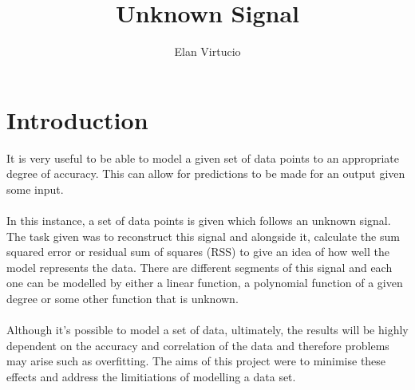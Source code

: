 \documentclass[a4paper,11pt]{article}
\begin{document}
\title{\Large{\textbf{Unknown Signal}}}
\author{Elan Virtucio}
\date{}
\maketitle

\section{Introduction}
It is very useful to be able to model a given set of data points to an
appropriate degree of accuracy. This can allow for predictions to be made
for an output given some input.
\\ \\
In this instance, a set of data points is given which follows an unknown
signal. The task given was to reconstruct this signal and alongside it,
calculate the sum squared error or residual sum of squares (RSS) to give an
idea of how well the model represents the data.  There are different segments
of this signal and each one can be modelled by either a linear function, a
polynomial function of a given degree or some other function that is unknown.
\\ \\
Although it's possible to model a set of data, ultimately, the results will
be highly dependent on the accuracy and correlation of the data and therefore
problems may arise such as overfitting. The aims of this project were to
minimise these effects and address the limitiations of modelling a data set.
\end{document}
